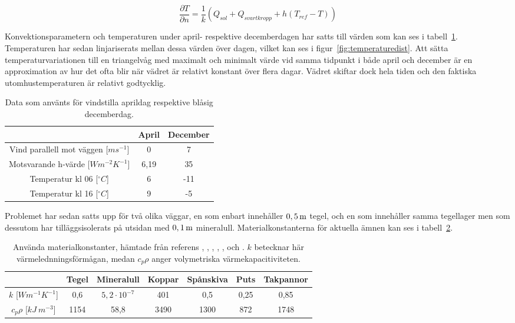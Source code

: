 \begin{equation}
\label{eq:wallneumann}
\frac{\partial T}{\partial n} = \frac{1}{k}\left( Q_{sol} + Q_{svartkropp} + h(T_{ref}-T) \right)
\end{equation}

Konvektionsparametern och temperaturen under april- respektive decemberdagen har satts till värden som kan ses i tabell~\ref{tbl:aprdec}. Temperaturen har sedan linjariserats mellan dessa värden över dagen, vilket kan ses i figur~\ref{fig:temperaturedist}. Att sätta temperaturvariationen till en triangelvåg med maximalt och minimalt värde vid samma tidpunkt i både april och december är en approximation av hur det ofta blir när vädret är relativt konstant över flera dagar. Vädret skiftar dock hela tiden och den faktiska utomhustemperaturen är relativt godtycklig.

\begin{table}[hpbt]
\centering
\caption{Data som använts för vindstilla aprildag respektive blåsig decemberdag.}
\begin{tabular}{c|c|c}
& April & December \\
\hline
Vind parallell mot väggen [$ms^{-1}$] & 0 & 7 \\
Motsvarande h-värde [$Wm^{-2}K^{-1}$] & 6,19 & 35 \\
Temperatur kl 06 [$^{\circ}C$] & 6 & -11 \\
Temperatur kl 16 [$^{\circ}C$] & 9 & -5
\end{tabular}
\label{tbl:aprdec}
\end{table}


Problemet har sedan satts upp för två olika väggar, en som enbart innehåller $\unit[0,5]{m}$ tegel, och en som innehåller samma tegellager men som dessutom har tilläggsisolerats på utsidan med $\unit[0,1]{m}$ mineralull. Materialkonstanterna för aktuella ämnen kan ses i tabell~\ref{tbl:materialconstants}.

\begin{table}[hpbt]
\centering
\caption{Använda materialkonstanter, hämtade från referens \cite{kandidatarbete2010}, \cite{engineeringtoolboxdensity}, \cite{bkvthermal}, \cite{engineeringtoolboxspecificheat}, \cite{engineeringcom}, \cite{engineeringtoolboxthermalconductivity} och \cite{ozel11}. $k$ betecknar här värmelednningsförmågan, medan $c_p\rho$ anger volymetriska värmekapacitiviteten.}
\begin{tabular}{c|c|c|c|c|c|c}
& Tegel & Mineralull & Koppar & Spånskiva & Puts & Takpannor \\
\hline
$k$ [$Wm^{-1}K^{-1}$] & 0,6 & $5,2\cdot 10^{-7}$ & 401 & 0,5 & 0,25 & 0,85\\
$c_p \rho$ [$kJ~m^{-3}$] & 1154 & 58,8 & 3490 & 1300 & 872 & 1748
\end{tabular}
\label{tbl:materialconstants}
\end{table}

